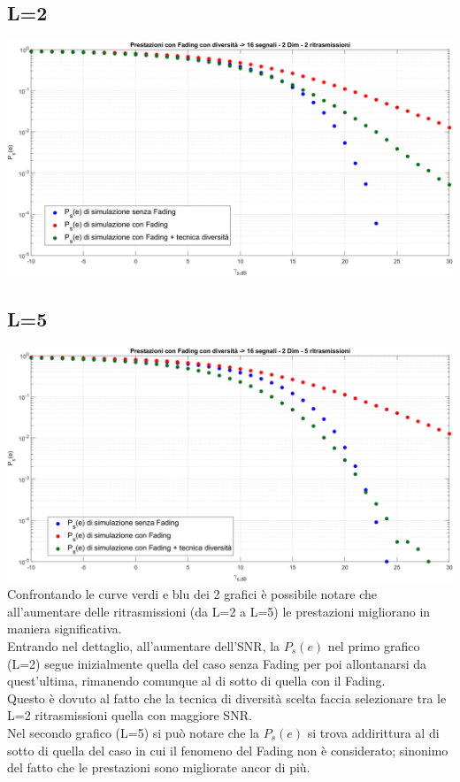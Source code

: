 \documentclass[12pt, a4paper]{article}
\begin{document}
	\subsection{L=2}
	\centering
	\includegraphics[width=0.85\linewidth]{images/PSK 1e5 2 L.png}
	\justify
	\subsection{L=5}
	\centering
	\includegraphics[width=0.85\linewidth]{images/PSK 1e5 5 L.png}
	\justify
	Confrontando le curve verdi e blu dei 2 grafici è possibile notare che all’aumentare delle ritrasmissioni (da L=2 a L=5) le prestazioni migliorano in maniera significativa.\vspace{.3cm} \\
	Entrando nel dettaglio, all’aumentare dell’SNR, la \(P_s(e)\) nel primo grafico (L=2) segue inizialmente quella del caso senza Fading per poi allontanarsi da quest’ultima, rimanendo comunque al di sotto di quella con il Fading.\vspace{.3cm}\\
	Questo è dovuto al fatto che la tecnica di diversità scelta faccia selezionare tra le L=2 ritrasmissioni quella con maggiore SNR.\vspace{.3cm}\\
	Nel secondo grafico (L=5) si può notare che la \(P_s(e)\) si trova addirittura al di sotto di quella del caso in cui il fenomeno del Fading non è considerato; sinonimo del fatto che le prestazioni sono migliorate ancor di più.
	
\end{document}

